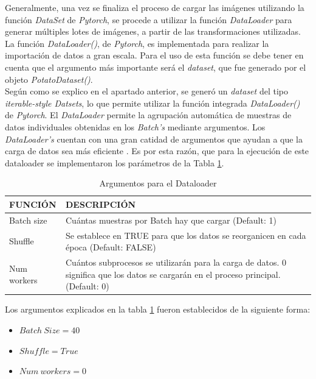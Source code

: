 			Generalmente, una vez se finaliza el proceso de cargar las imágenes utilizando la función \textit{DataSet} de \textit{Pytorch}, se procede a utilizar la función \textit{DataLoader} para generar múltiples lotes de imágenes, a partir de las transformaciones utilizadas. La función \textit{DataLoader()}, de \textit{Pytorch}, es implementada para realizar la importación de datos a gran escala. Para el uso de esta función se debe tener en cuenta que el argumento más importante será el \textit{dataset}, que fue generado por el objeto \textit{PotatoDataset()}. \\
			
			Según como se explico en el apartado anterior, se generó un \textit{dataset} del tipo \textit{iterable-style Datsets}, lo que permite utilizar la función integrada \textit{DataLoader()} de \textit{Pytorch}. El \textit{DataLoader} permite la agrupación automática de muestras de datos individuales obtenidas en los \textit{Batch's} mediante argumentos. Los \textit{DataLoader's} cuentan con una gran catidad de argumentos que ayudan a que la carga de datos sea más eficiente \cite{Pytorch}. Es por esta razón, que para la ejecución de este dataloader se implementaron los parámetros de la Tabla \ref{table:Argumentos}.
\newpage			
			\begin{table}[ht]
				\centering
				\begin{tabular}{|p{3cm}|p{8cm}|}
					\hline
					FUNCIÓN & DESCRIPCIÓN \\ 
					\hline
					Batch size & Cuántas muestras por Batch hay que cargar (Default: 1)\\
					\hline
					Shuffle & Se establece en TRUE para que los datos se reorganicen en cada época (Default: FALSE)  \\
					\hline
					Num workers & Cuántos subprocesos se utilizarán para la carga de datos. 0 significa que los datos se cargarán en el proceso principal. (Default: 0)\\
					\hline
				\end{tabular}	
				\caption{Argumentos para el Dataloader}
				\label{table:Argumentos}
			\end{table}
		
		Los argumentos explicados en la tabla \ref{table:Argumentos} fueron establecidos de la siguiente forma:
		
		\begin{itemize}
			\item $Batch \ Size = 40$
			\item $Shuffle = True$
			\item $Num \ workers = 0$
		\end{itemize}

